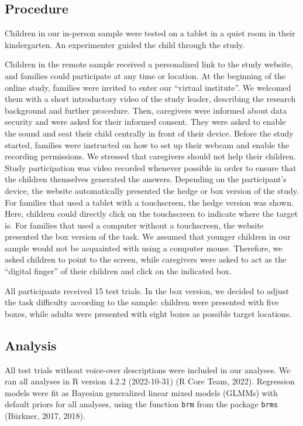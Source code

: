\documentclass[
  man,floatsintext]{apa7}
\begin{document}
\hypertarget{procedure}{%
\subsection{Procedure}\label{procedure}}

Children in our in-person sample were tested on a tablet in a quiet room in their kindergarten.
An experimenter guided the child through the study.

Children in the remote sample received a personalized link to the study website, and families could participate at any time or location.
At the beginning of the online study, families were invited to enter our ``virtual institute''.
We welcomed them with a short introductory video of the study leader, describing the research background and further procedure.
Then, caregivers were informed about data security and were asked for their informed consent.
They were asked to enable the sound and seat their child centrally in front of their device.
Before the study started, families were instructed on how to set up their webcam and enable the recording permissions.
We stressed that caregivers should not help their children.
Study participation was video recorded whenever possible in order to ensure that the children themselves generated the answers.
Depending on the participant's device, the website automatically presented the hedge or box version of the study.
For families that used a tablet with a touchscreen, the hedge version was shown.
Here, children could directly click on the touchscreen to indicate where the target is.
For families that used a computer without a touchscreen, the website presented the box version of the task.
We assumed that younger children in our sample would not be acquainted with using a computer mouse.
Therefore, we asked children to point to the screen, while caregivers were asked to act as the ``digital finger'' of their children and click on the indicated box.

All participants received 15 test trials.
In the box version, we decided to adjust the task difficulty according to the sample: children were presented with five boxes, while adults were presented with eight boxes as possible target locations.

\hypertarget{analysis}{%
\subsection{Analysis}\label{analysis}}

All test trials without voice-over descriptions were included in our analyses.
We ran all analyses in R version 4.2.2 (2022-10-31) (R Core Team, 2022).
Regression models were fit as Bayesian generalized linear mixed models (GLMMs) with default priors for all analyses, using the function \texttt{brm} from the package \texttt{brms} (Bürkner, 2017, 2018).
\end{document}

